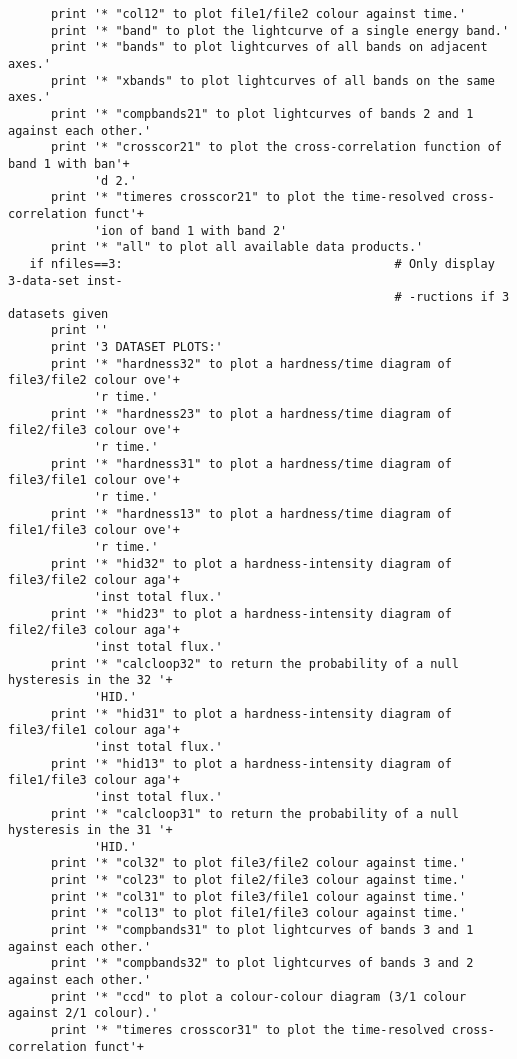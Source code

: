 \begin{verbatim}
      print '* "col12" to plot file1/file2 colour against time.'
      print '* "band" to plot the lightcurve of a single energy band.'
      print '* "bands" to plot lightcurves of all bands on adjacent axes.'
      print '* "xbands" to plot lightcurves of all bands on the same axes.'
      print '* "compbands21" to plot lightcurves of bands 2 and 1 against each other.'
      print '* "crosscor21" to plot the cross-correlation function of band 1 with ban'+
            'd 2.'
      print '* "timeres crosscor21" to plot the time-resolved cross-correlation funct'+
            'ion of band 1 with band 2' 
      print '* "all" to plot all available data products.'
   if nfiles==3:                                      # Only display 3-data-set inst-
                                                      # -ructions if 3 datasets given
      print ''
      print '3 DATASET PLOTS:'
      print '* "hardness32" to plot a hardness/time diagram of file3/file2 colour ove'+
            'r time.'
      print '* "hardness23" to plot a hardness/time diagram of file2/file3 colour ove'+
            'r time.'
      print '* "hardness31" to plot a hardness/time diagram of file3/file1 colour ove'+
            'r time.'
      print '* "hardness13" to plot a hardness/time diagram of file1/file3 colour ove'+
            'r time.'
      print '* "hid32" to plot a hardness-intensity diagram of file3/file2 colour aga'+
            'inst total flux.'
      print '* "hid23" to plot a hardness-intensity diagram of file2/file3 colour aga'+
            'inst total flux.'
      print '* "calcloop32" to return the probability of a null hysteresis in the 32 '+
            'HID.'
      print '* "hid31" to plot a hardness-intensity diagram of file3/file1 colour aga'+
            'inst total flux.'
      print '* "hid13" to plot a hardness-intensity diagram of file1/file3 colour aga'+
            'inst total flux.'
      print '* "calcloop31" to return the probability of a null hysteresis in the 31 '+
            'HID.'
      print '* "col32" to plot file3/file2 colour against time.'
      print '* "col23" to plot file2/file3 colour against time.'
      print '* "col31" to plot file3/file1 colour against time.'
      print '* "col13" to plot file1/file3 colour against time.'
      print '* "compbands31" to plot lightcurves of bands 3 and 1 against each other.'
      print '* "compbands32" to plot lightcurves of bands 3 and 2 against each other.'
      print '* "ccd" to plot a colour-colour diagram (3/1 colour against 2/1 colour).'
      print '* "timeres crosscor31" to plot the time-resolved cross-correlation funct'+

\end{verbatim}
